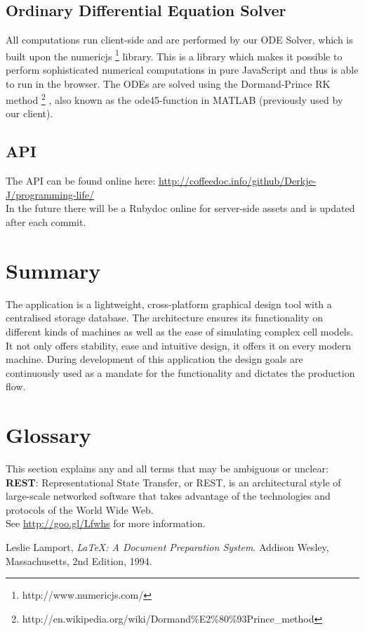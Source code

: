 \documentclass{report}
\begin{document}
		\subsection{Ordinary Differential Equation Solver}
			All computations run client-side and are performed by our ODE Solver, which is built upon the numericjs \footnote{http://www.numericjs.com/} library. This is a library which makes it possible to perform sophisticated numerical computations in pure JavaScript and thus is able to run in the browser. The ODEs are solved using the Dormand-Prince RK method \footnote{http://en.wikipedia.org/wiki/Dormand\%E2\%80\%93Prince\_method} , also known as the ode45-function in MATLAB (previously used by our client).
			
		\subsection{API}
			The API can be found online here: \url{http://coffeedoc.info/github/Derkje-J/programming-life/} \\
			In the future there will be a Rubydoc online for server-side assets and is updated after each commit.
		\newpage
			
	\section{Summary}
		The application is a lightweight, cross-platform graphical design tool with a centralised storage database. The architecture ensures its functionality on different kinds of machines as well as the ease of simulating complex cell models. It not only offers stability, ease and intuitive design, it offers it on every modern machine. During development of this application the design goals are continuously used as a mandate for the functionality and dictates the production flow.
	\section{Glossary}
		This section explains any and all terms that may be ambiguous or unclear:\\
		
		\textbf{REST}: Representational State Transfer, or REST, is an architectural style of large-scale networked software that takes advantage of the technologies and protocols of the World Wide Web. \\
See \href{http://goo.gl/Lfwhs}{http://goo.gl/Lfwhs} for more information.



\listoffootnotes \clearpage

\begin{thebibliography}{9}

Leslie Lamport,
\emph{\LaTeX: A Document Preparation System}.
Addison Wesley, Massachusetts,
2nd Edition,
1994.

\end{thebibliography}
\end{document}
